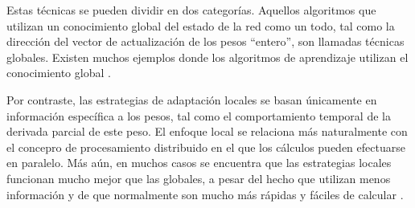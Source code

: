 Estas técnicas se pueden dividir en dos
categorías. Aquellos algoritmos que utilizan un conocimiento global
del estado de la red como un todo, tal como la dirección del vector de
actualización de los pesos ``entero'', son llamadas técnicas globales.
Existen muchos ejemplos donde los algoritmos de aprendizaje utilizan el
conocimiento global \cite{salomon,moeller}.

Por contraste, las estrategias de adaptación locales se basan
únicamente en información específica a los pesos, tal como el
comportamiento temporal de la derivada parcial de este peso. El
enfoque local se relaciona más naturalmente con el concepro de
procesamiento distribuido en el que los cálculos pueden efectuarse en
paralelo.  Más aún, en muchos casos se encuentra que las estrategias
locales funcionan mucho mejor que las globales, a pesar del hecho que
utilizan menos información y de que normalmente son mucho más rápidas
y fáciles de calcular \cite{schiffmann}.
%
